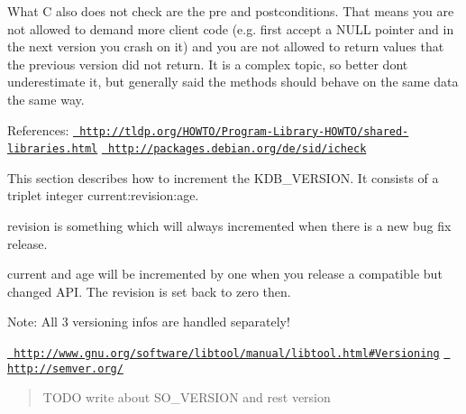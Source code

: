 What C also does not check are the pre and postconditions. That means you are not allowed to demand more client code (e.\+g. first accept a N\+U\+LL pointer and in the next version you crash on it) and you are not allowed to return values that the previous version did not return. It is a complex topic, so better don\textquotesingle{}t underestimate it, but generally said the methods should behave on the same data the same way.

References\+: \href{http://tldp.org/HOWTO/Program-Library-HOWTO/shared-libraries.html}{\texttt{ http\+://tldp.\+org/\+H\+O\+W\+T\+O/\+Program-\/\+Library-\/\+H\+O\+W\+T\+O/shared-\/libraries.\+html}} \href{http://packages.debian.org/de/sid/icheck}{\texttt{ http\+://packages.\+debian.\+org/de/sid/icheck}}

This section describes how to increment the {\ttfamily K\+D\+B\+\_\+\+V\+E\+R\+S\+I\+ON}. It consists of a triplet integer {\ttfamily current\+:revision\+:age}.

{\ttfamily revision} is something which will always incremented when there is a new bug fix release.

{\ttfamily current} and {\ttfamily age} will be incremented by one when you release a compatible but changed A\+PI. The revision is set back to zero then.

Note\+: All 3 versioning infos are handled separately!

\href{http://www.gnu.org/software/libtool/manual/libtool.html\#Versioning}{\texttt{ http\+://www.\+gnu.\+org/software/libtool/manual/libtool.\+html\#\+Versioning}} \href{http://semver.org/}{\texttt{ http\+://semver.\+org/}}

\begin{quote}
T\+O\+DO write about S\+O\+\_\+\+V\+E\+R\+S\+I\+ON and rest version \end{quote}
